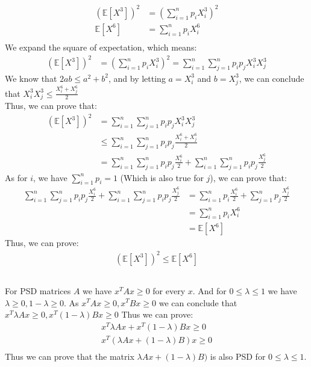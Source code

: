 \documentclass{article}
\begin{document}
\subsection{}\label{sub:} %
\begin{align*}
    (\mathbb{E}[X^3])^2 &= (\sum_{i=1}^{n} p_iX_i^3)^2 \\
    \mathbb{E}[X^6] &= \sum_{i=1 }^{n} p_iX_i^6 \\
\end{align*}
We expand the square of expectation, which means:
\begin{align*}
    (\mathbb{E}[X^3])^2 &= (\sum_{i=1}^{n} p_iX_i^3)^2 =\sum_{i=1}^{n} \sum_{j=1 }^{n} p_ip_jX_i^3X_j^3
\end{align*}
We know that $ 2ab \leq a^2 + b^2 $, and by letting $ a = X_i^3 $ and $ b = X_j^3 $, we can conclude that $ X_i^3X_j^3\leq \frac{X_i^6 + X_j^6}{2} $ \\
Thus, we can prove that:
\begin{align*}
    (\mathbb{E}[X^3])^2 &= \sum_{i=1}^{n} \sum_{j=1 }^{n} p_ip_jX_i^3X_j^3 \\
                        &\leq \sum_{i=1}^{n} \sum_{j=1 }^{n} p_ip_j\frac{X_i^6 + X_j^6}{2} \\
                        &= \sum_{i=1}^{n} \sum_{j=1 }^{n} p_ip_j \frac{X_i^6}{2} + \sum_{i=1}^{n} \sum_{j=1 }^{n} p_ip_j \frac{X_j^6 }{2}
\end{align*}
As for $ i $, we have $ \sum_{i=1}^{n} p_i=1 $ (Which is also true for $ j $), we can prove that:
\begin{align*}
    \sum_{i=1}^{n} \sum_{j=1 }^{n} p_ip_j \frac{X_i^6}{2} + \sum_{i=1}^{n} \sum_{j=1 }^{n} p_ip_j \frac{X_j^6 }{2} &= \sum_{i=1}^{n} p_i \frac{X_i^6 }{2} + \sum_{j=1 }^{n} p_j \frac{X_j^6 }{2} \\
&= \sum_{i=1}^{n} p_iX_i^6 \\
&= \mathbb{E}[X^6]
\end{align*}
Thus, we can prove:
\begin{align*}
    (\mathbb{E}[X^3])^2 \leq \mathbb{E}[X^6]
\end{align*}
\subsection{}\label{sub:} %
For PSD matrices $ A $ we have $ x^TAx\geq 0 $ for every $ x $. And for $ 0\leq \lambda \leq 1 $ we have $ \lambda \geq 0, 1- \lambda \geq 0 $. 
As $ x^TAx \geq 0, x^TBx \geq 0 $ we can conclude that $ x^T\lambda Ax\geq 0, x^T(1-\lambda)Bx\geq 0 $
Thus we can prove:
\begin{align*}
    x^T\lambda Ax + x^T(1-\lambda)Bx\geq 0 \\
    x^T(\lambda Ax + (1-\lambda)B)x\geq 0 \\
\end{align*}
Thus we can prove that the matrix $ \lambda Ax + (1-\lambda)B) $ is also PSD for $ 0 \leq \lambda \leq 1 $.
\end{document}
